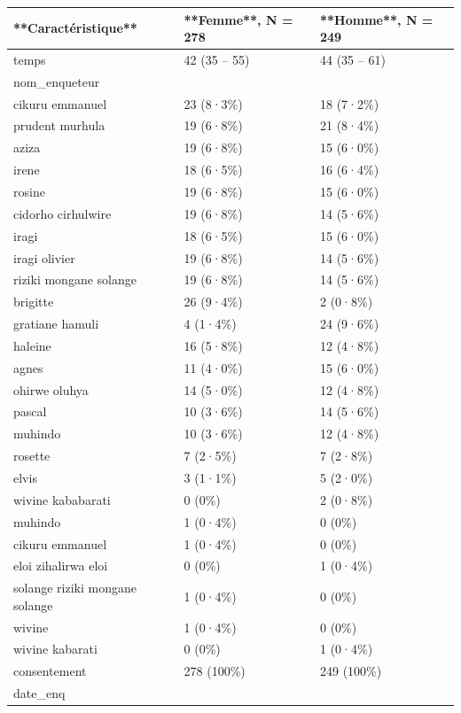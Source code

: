 \documentclass[
]{book}
\begin{document}
\begin{tabular}{l|l|l}
\hline
**Caractéristique** & **Femme**, N = 278 & **Homme**, N = 249\\
\hline
temps & 42 (35 – 55) & 44 (35 – 61)\\
\hline
nom\_enqueteur &  & \\
\hline
cikuru emmanuel & 23 (8·3\%) & 18 (7·2\%)\\
\hline
prudent murhula & 19 (6·8\%) & 21 (8·4\%)\\
\hline
aziza & 19 (6·8\%) & 15 (6·0\%)\\
\hline
irene & 18 (6·5\%) & 16 (6·4\%)\\
\hline
rosine & 19 (6·8\%) & 15 (6·0\%)\\
\hline
cidorho cirhulwire & 19 (6·8\%) & 14 (5·6\%)\\
\hline
iragi & 18 (6·5\%) & 15 (6·0\%)\\
\hline
iragi olivier & 19 (6·8\%) & 14 (5·6\%)\\
\hline
riziki mongane solange & 19 (6·8\%) & 14 (5·6\%)\\
\hline
brigitte & 26 (9·4\%) & 2 (0·8\%)\\
\hline
gratiane hamuli & 4 (1·4\%) & 24 (9·6\%)\\
\hline
haleine & 16 (5·8\%) & 12 (4·8\%)\\
\hline
agnes & 11 (4·0\%) & 15 (6·0\%)\\
\hline
ohirwe oluhya & 14 (5·0\%) & 12 (4·8\%)\\
\hline
pascal & 10 (3·6\%) & 14 (5·6\%)\\
\hline
muhindo & 10 (3·6\%) & 12 (4·8\%)\\
\hline
rosette & 7 (2·5\%) & 7 (2·8\%)\\
\hline
elvis & 3 (1·1\%) & 5 (2·0\%)\\
\hline
wivine kababarati & 0 (0\%) & 2 (0·8\%)\\
\hline
muhindo & 1 (0·4\%) & 0 (0\%)\\
\hline
cikuru emmanuel & 1 (0·4\%) & 0 (0\%)\\
\hline
eloi zihalirwa eloi & 0 (0\%) & 1 (0·4\%)\\
\hline
solange riziki mongane solange & 1 (0·4\%) & 0 (0\%)\\
\hline
wivine & 1 (0·4\%) & 0 (0\%)\\
\hline
wivine kabarati & 0 (0\%) & 1 (0·4\%)\\
\hline
consentement & 278 (100\%) & 249 (100\%)\\
\hline
date\_enq &  & \\

\end{tabular}
\end{document}
